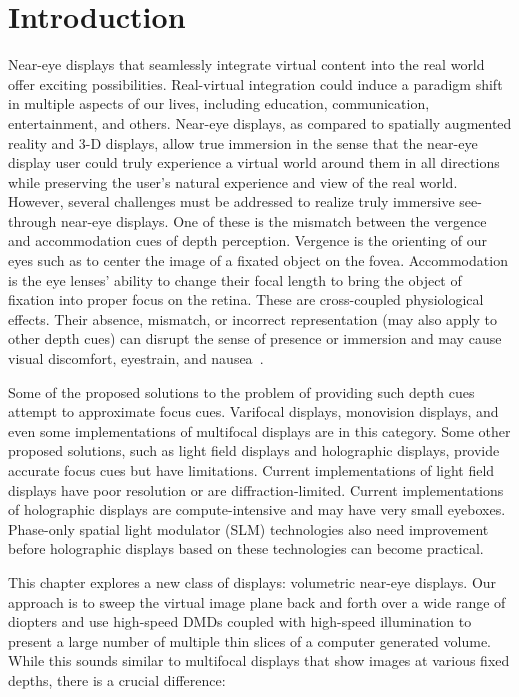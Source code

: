 \section{Introduction}
\label{sec:volumetric:introduction}
Near-eye displays that seamlessly integrate virtual content into the real world offer exciting possibilities. Real-virtual integration could induce a paradigm shift in multiple aspects of our lives, including education, communication, entertainment, and others. Near-eye displays, as compared to spatially augmented reality and 3-D displays, allow true immersion in the sense that the near-eye display user could truly experience a virtual world around them in all directions while preserving the user's natural experience and view of the real world. However, several challenges must be addressed to realize truly immersive see-through near-eye displays. One of these is the mismatch between the vergence and accommodation cues of depth perception. Vergence is the orienting of our eyes such as to center the image of a fixated object on the fovea. Accommodation is the eye lenses' ability to change their focal length to bring the object of fixation into proper focus on the retina. These are cross-coupled physiological effects. Their absence, mismatch, or incorrect representation (may also apply to other depth cues) can disrupt the sense of presence or immersion and may cause visual discomfort, eyestrain, and nausea~\cite{Hoffman2008Vergence}. 

Some of the proposed solutions to the problem of providing such depth cues attempt to approximate focus cues. Varifocal displays, monovision displays, and even some implementations of multifocal displays are in this category. Some other proposed solutions, such as light field displays and holographic displays, provide accurate focus cues but have limitations. Current implementations of light field displays have poor resolution or are diffraction-limited. Current implementations of holographic displays are compute-intensive and may have very small eyeboxes. Phase-only spatial light modulator (SLM) technologies also need improvement before holographic displays based on these technologies can become practical.

This chapter explores a new class of displays: volumetric near-eye displays. Our approach is to sweep the virtual image plane back and forth over a wide range of diopters and use high-speed DMDs coupled with high-speed illumination to present a large number of multiple thin slices of a computer generated volume. While this sounds similar to multifocal displays that show images at various fixed depths, there is a crucial difference:

